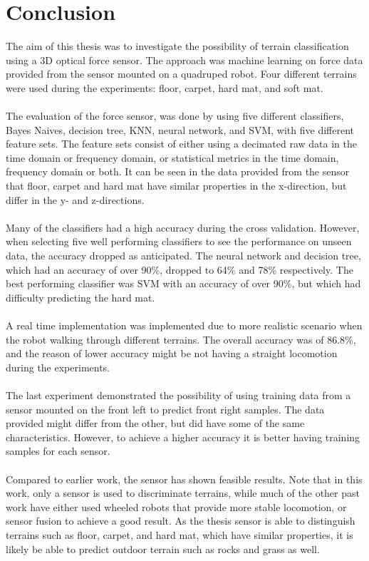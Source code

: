 \documentclass[USenglish]{ifimaster}  %
\begin{document}
\section{Conclusion}
The aim of this thesis was to investigate the possibility of terrain classification using a 3D optical force sensor. The approach was machine learning on force data provided from the sensor mounted on a quadruped robot. Four different terrains were used during the experiments: floor, carpet, hard mat, and soft mat. 
\\
\\
The evaluation of the force sensor, was done by using five different classifiers, Bayes Naives, decision tree, KNN, neural network, and SVM, with five different feature sets. The feature sets consist of either using a decimated raw data in the time domain or frequency domain, or statistical metrics in the time domain, frequency domain or both. It can be seen in the data provided from the sensor that floor, carpet and hard mat have similar properties in the x-direction, but differ in the y- and z-directions. 
\\
\\
Many of the classifiers had a high accuracy during the cross validation. However, when selecting five well performing classifiers to see the performance on unseen data, the accuracy dropped as anticipated. The neural network and decision tree, which had an accuracy of over 90\%, dropped to 64\% and 78\% respectively. The best performing classifier was SVM with an accuracy of over 90\%, but which had difficulty predicting the hard mat.
\\
\\
A real time implementation was implemented due to more realistic scenario when the robot walking through different terrains. The overall accuracy was of 86.8\%, and the reason of lower accuracy might be not having a straight locomotion during the experiments. 
\\
\\
The last experiment demonstrated the possibility of using training data from a sensor mounted on the front left to predict front right samples. The data provided might differ from the other, but did have some of the same characteristics. However, to achieve a higher accuracy it is better having training samples for each sensor. 
\\
\\
Compared to earlier work, the sensor has shown feasible results. Note that in this work, only a sensor is used to discriminate terrains, while much of the other past work have either used wheeled robots that provide more stable locomotion, or sensor fusion to achieve a good result. As the thesis sensor is able to distinguish terrains such as floor, carpet, and hard mat, which have similar properties, it is likely be able to predict outdoor terrain such as rocks and grass as well.
	
\end{document}
